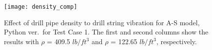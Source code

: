\begin{figure}
  \centering
  \texttt{[image: density\_comp]}
  \caption[Effect of drill pipe density in Python ver.\ for Test Case 1]{Effect of drill pipe density to drill string vibration for A-S model, Python ver.\ for Test Case 1. The first and second columns show the results with $\rho$ = 409.5 $lb/ft^3$ and  $\rho$ = 122.65 $lb/ft^3$, respectively.}\label{figure_Python_reducedDensity}
\end{figure}


